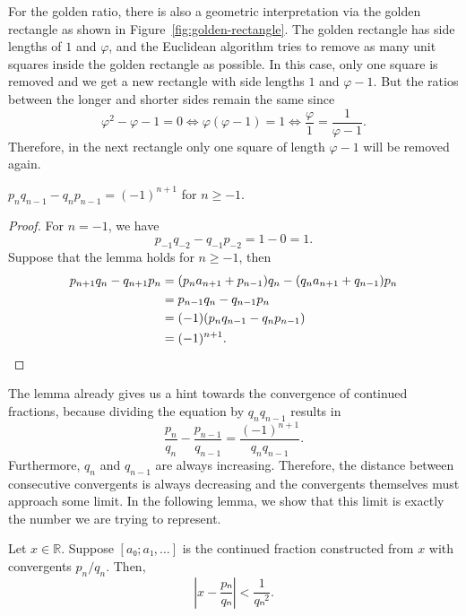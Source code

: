 For the golden ratio, there is also a geometric interpretation via the golden
rectangle as shown in Figure~\ref{fig:golden-rectangle}.
The golden rectangle has side lengths of $1$ and $φ$,
and the Euclidean algorithm tries to remove as many unit squares inside the
golden rectangle as possible.
In this case, only one square is removed
and we get a new rectangle with side lengths $1$ and $φ - 1$.
But the ratios between the longer and shorter sides remain the same since
\[
  φ^2 - φ - 1 = 0 ⇔ φ(φ - 1) = 1 ⇔ \frac{φ}{1} = \frac{1}{φ - 1}.
\]
Therefore, in the next rectangle only one square of length $φ - 1$ will be
removed again.

\begin{lemma}
  \label{lem:cf-det}
  $p_n q_{n-1} - q_n p_{n-1} = (-1)^{n+1}$ for $n ≥ -1$.
\end{lemma}

\begin{proof}
  For $n = -1$, we have
  \[
    p_{-1} q_{-2} - q_{-1} p_{-2} = 1 - 0 = 1.
  \]
  Suppose that the lemma holds for $n ≥ -1$, then
  \begin{align*}
    p_{n+1} q_n - q_{n+1} p_n
    & = (p_n a_{n+1} + p_{n-1}) q_n - (q_n a_{n+1} + q_{n-1}) p_n \\
    & = p_{n-1} q_n - q_{n-1} p_n \\
    & = (-1) (p_n q_{n-1} - q_n p_{n-1}) \\
    & = (-1)^{n+1}. \qedhere
  \end{align*}
\end{proof}

The lemma already gives us a hint towards the convergence of continued fractions,
because dividing the equation by $q_n q_{n-1}$ results in
\[
  \frac{p_n}{q_n} - \frac{p_{n-1}}{q_{n-1}} = \frac{(-1)^{n+1}}{q_n q_{n-1}}.
\]
Furthermore, $q_n$ and $q_{n-1}$ are always increasing.
Therefore, the distance between consecutive convergents is always decreasing
and the convergents themselves must approach some limit.
In the following lemma, we show that this limit is exactly the number we are trying to represent.

\begin{lemma}
  \label{lem:cf-approx}
  Let $x ∈ ℝ$.
  Suppose $[a₀; a₁, …]$ is the continued fraction constructed from $x$ with convergents $p_n/q_n$.
  Then,
  \[
    \left| x - \frac{pₙ}{qₙ} \right| < \frac{1}{qₙ^2}.
  \]
\end{lemma}

